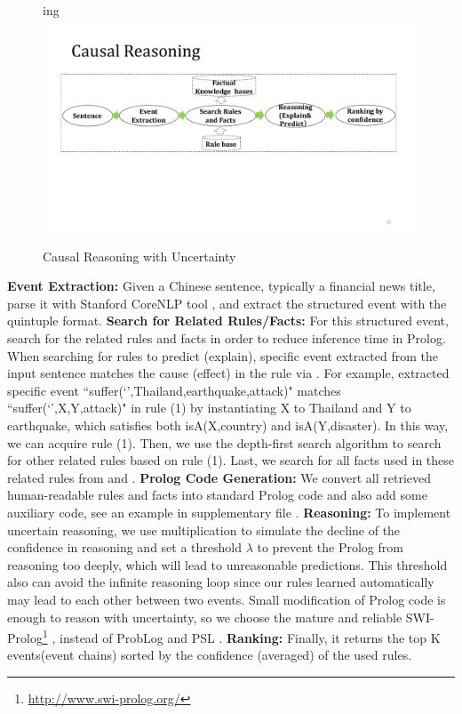 \begin{figure}[htbp]
	\center
	ing
	\includegraphics[width=0.95\columnwidth]{figures/reasoning}
	\caption{Causal Reasoning with Uncertainty }
	\label{fig:causal_reasoning}
\end{figure}

\textbf{Event Extraction:} Given a Chinese sentence, typically a financial news title, parse it with Stanford CoreNLP tool \cite{Manning}, and extract the structured event with the quintuple format. 
\textbf{Search for Related Rules/Facts:} For this structured event, search for the related rules and facts in order to reduce inference time in Prolog. When searching for rules to predict (explain), specific event extracted from the input sentence matches the cause (effect) in the rule via \zhpro. For example, extracted specific event ``suffer(`',Thailand,earthquake,attack)" matches ``suffer(`',X,Y,attack)" in rule (1) by instantiating X to Thailand and Y to earthquake, which satisfies both isA(X,country) and isA(Y,disaster). In this way, we can acquire rule (1). Then, we use the depth-first search algorithm to search for other related rules based on rule (1). Last, we search for all facts used in these related rules from \zhpro and \zhcon.
\textbf{Prolog Code Generation:}
We convert all retrieved human-readable rules and facts into standard Prolog code and also add some auxiliary code, see an example in supplementary file .
\textbf{Reasoning:}
To implement uncertain reasoning, we use multiplication to simulate the decline of the confidence in reasoning and set a threshold $\lambda$ to prevent the Prolog from reasoning too deeply, which will lead to unreasonable predictions. This threshold also can avoid the infinite reasoning loop since our rules learned automatically may lead to each other between two events. Small modification of Prolog code 
is enough to reason with uncertainty, so we choose the mature and reliable SWI-Prolog\footnote{\url{http://www.swi-prolog.org/}} \cite{Wielemaker2010}, instead of ProbLog \cite{de2007problog} and PSL \cite{bach:jmlr17}.
\textbf{Ranking:}
Finally, it returns the top K events(event chains) sorted by the confidence (averaged) of the used rules.